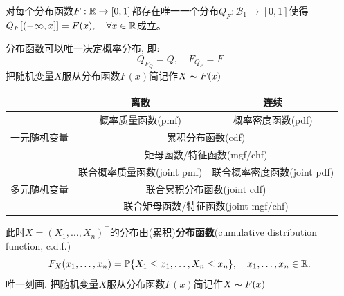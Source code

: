 \begin{proposition}
    对每个分布函数$F : \mathbb{R} \to [0,1]$都存在唯一一个分布$Q_F: \mathscr{B}_1 \to [0,1]$使得$Q_F[(-\infty,x]]=F(x), \quad \forall x \in \mathbb{R}$成立。
\end{proposition}

\begin{theorem}
    分布函数可以唯一决定概率分布, 即:
    \[ Q_{F_Q}=Q, \quad F_{Q_F}=F \]
    把随机变量$X$服从分布函数$F(x)$简记作$X \thicksim F(x)$
\end{theorem}

\begin{table}[h]
    \centering
    \begin{tabular}{|c|cc|}
        \hline
                                      & \multicolumn{1}{c|}{离散}                                 & 连续                        \\ \hline
        \multirow{3}{*}{一元随机变量} & \multicolumn{1}{c|}{概率质量函数(pmf)}                    & 概率密度函数(pdf)           \\ \cline{2-3}
                                      & \multicolumn{2}{c|}{累积分布函数(cdf)}                                                  \\ \cline{2-3}
                                      & \multicolumn{2}{c|}{矩母函数/特征函数(mgf/chf)}                                         \\ \hline
        \multirow{3}{*}{多元随机变量} & \multicolumn{1}{c|}{联合概率质量函数(joint pmf)}          & 联合概率密度函数(joint pdf) \\ \cline{2-3}
                                      & \multicolumn{2}{c|}{联合累积分布函数(joint cdf)}                                        \\ \cline{2-3}
                                      & \multicolumn{2}{c|}{联合矩母函数/特征函数(joint mgf/chf)}                               \\ \hline
    \end{tabular}
\end{table}

\begin{definition}[累积分布函数]
    此时$X = (X_{1},\dots,X_{n})^{\top}$的分布由(累积)\textbf{分布函数}(cumulative distribution function, c.d.f.)
    \[ F_{X}(x_{1},\dots,x_{n}) = \mathbb{P}\{X_{1}\leq x_{1},\dots, X_{n}\leq x_{n}\}, \quad x_{1},\dots,x_{n}\in\mathbb{R}. \]
    唯一刻画. 把随机变量$X$服从分布函数$F(x)$简记作$X \thicksim F(x)$
\end{definition}

